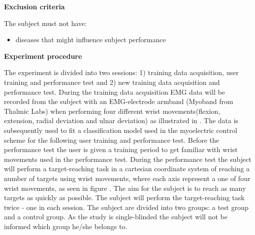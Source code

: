 \textbf{Exclusion criteria}

The subject must not have:
\begin{itemize}
	\item diseases that might influence subject performance   
\end{itemize}


\textbf{Experiment procedure}

The experiment is divided into two sessions: 1) training data acquisition, user training and performance test and 2) new training data acquisition and performance test. During the training data acquisition EMG data will be recorded from the subject with an EMG-electrode armband (Myoband from Thalmic Labs) when performing four different wrist movements(flexion, extension, radial deviation and ulnar deviation) as illustrated in . The data is subsequently used to fit a classification model used in the myoelectric control scheme for the following user training and performance test. Before the performance test the user is given a training period to get familiar with wrist movements used in the performance test. During the performance test the subject will perform a target-reaching task in a cartesian coordinate system of reaching a number of targets using wrist movements, where each axis represent a one of four wrist movements, as seen in figure . The aim for the subject is to reach as many targets as quickly as possible. The subject will perform the target-reaching task twice - one in each session. The subject are divided into two groups: a test group and a control group. As the study is single-blinded the subject will not be informed which group he/she belongs to.

